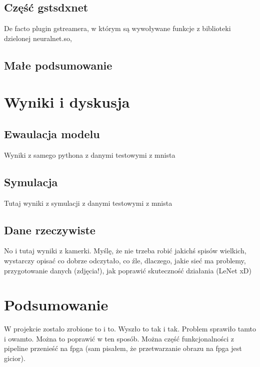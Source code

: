 \documentclass[12pt, oneside]{article}
\begin{document}
\subsection{Część gstsdxnet}
De facto plugin gstreamera, w którym są wywoływane funkcje z biblioteki
dzielonej neuralnet.so, 

\subsection{Małe podsumowanie}


\newpage
\section{Wyniki i dyskusja}

\subsection{Ewaulacja modelu}
Wyniki z samego pythona z danymi testowymi z mnista

\subsection{Symulacja}
Tutaj wyniki z symulacji z danymi testowymi z mnista

\subsection{Dane rzeczywiste}
No i tutaj wyniki z kamerki. Myślę, że nie trzeba robić jakichś spisów wielkich,
wystarczy opisać co dobrze odczytało, co źle, dlaczego, jakie sieć ma problemy,
przygotowanie danych (zdjęcia!), jak poprawić skuteczność działania (LeNet xD)

\newpage
\section{Podsumowanie}
W projekcie zostało zrobione to i to. Wyszło to tak i tak. Problem sprawiło
tamto i owamto. Można to poprawić w ten sposób. Można część funkcjonalności
z pipeline przenieść na fpga (sam pisałem, że przetwarzanie obrazu na fpga
jest gicior).
\end{document}
